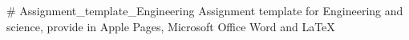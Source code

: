 # Assignment_template_Engineering
Assignment template for Engineering and science, provide in Apple Pages, Microsoft Office Word and LaTeX
